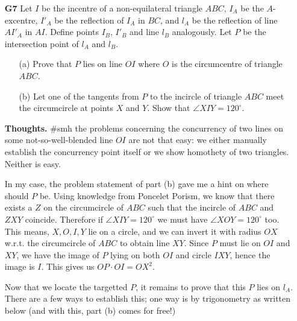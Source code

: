 \documentclass[11pt,a4paper]{article}
\begin{document}
\begin{itemize}
\newpage

\item[\textbf{G7}]
Let $I$ be the incentre of a non-equilateral triangle $ABC$, $I_A$ be the $A$-excentre, $I'_A$ be the reflection of $I_A$ in $BC$, and $l_A$ be the reflection of line $AI'_A$ in $AI$. Define points $I_B$, $I'_B$ and line $l_B$ analogously. Let $P$ be the intersection point of $l_A$ and $l_B$.

\begin{itemize}
\item [(a)] Prove that $P$ lies on line $OI$ where $O$ is the circumcentre of triangle $ABC$.
\item [(b)] Let one of the tangents from $P$ to the incircle of triangle $ABC$ meet the circumcircle at points $X$ and $Y$. Show that $\angle XIY = 120^{\circ}$.
\end{itemize}

\textbf{Thoughts.} \#smh the problems concerning the concurrency of two lines on some not-so-well-blended line $OI$ are not that easy: we either manually establish the concurrency point itself or we show homothety of two triangles. Neither is easy. 

In my case, the problem statement of part (b) gave me a hint on where should $P$ be. Using knowledge from Poncelet Porism, we know that there exists a $Z$ on the circumcircle of $ABC$ such that the incircle of $ABC$ and $ZXY$ coincide. 
Therefore if $\angle XIY=120^{\circ}$ we must have $\angle XOY=120^{\circ}$ too. 
This means, $X, O, I, Y$ lie on a circle, and we can invert it with radius $OX$ w.r.t. the circumcircle of $ABC$ to obtain line $XY$. 
Since $P$ must lie on $OI$ and $XY$, we have the image of $P$ lying on both $OI$ and circle $IXY$, hence the image is $I$. 
This gives us $OP\cdot OI=OX^2$. 

Now that we locate the targetted $P$, it remains to prove that this $P$ lies on $l_A$. There are a few ways to establish this; one way is by trigonometry as written below (and with this, part (b) comes for free!)


\end{itemize}
\end{document}
